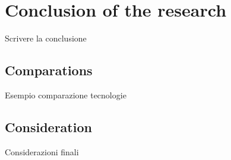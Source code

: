 \section{Conclusion of the research}
Scrivere la conclusione

\subsection{Comparations}
Esempio comparazione tecnologie

\subsection{Consideration}
Considerazioni finali
